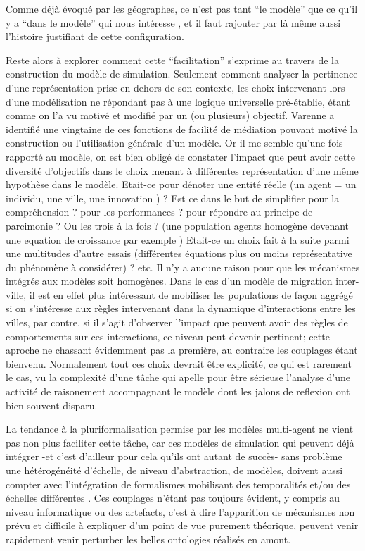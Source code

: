 Comme déjà évoqué par les géographes, ce n'est pas tant \enquote{le modèle} que ce qu'il y a \enquote{dans le modèle} qui nous intéresse \autocites{Sanders2000, Besse2000}, et il faut rajouter par là même aussi l'histoire justifiant de cette configuration. 

Reste alors à explorer comment cette \enquote{facilitation} s'exprime au travers de la construction du modèle de simulation. Seulement comment analyser la pertinence d'une représentation prise en dehors de son contexte, les choix intervenant lors d'une modélisation ne répondant pas à une logique universelle pré-établie, étant comme on l'a vu motivé et modifié par un (ou plusieurs) objectif. Varenne a identifié une vingtaine de ces fonctions de facilité de médiation pouvant motivé la construction ou l'utilisation générale d'un modèle. Or il me semble qu'une fois rapporté au modèle, on est bien obligé de constater l'impact que peut avoir cette diversité d'objectifs dans le choix menant à différentes représentation d'une même hypothèse dans le modèle. Etait-ce pour dénoter une entité réelle (un agent = un individu, une ville, une innovation ) ? Est ce dans le but de simplifier pour la compréhension ? pour les performances ? pour répondre au principe de parcimonie ? Ou les trois à la fois ? (une population agents homogène devenant une equation de croissance par exemple ) Etait-ce un choix fait à la suite parmi une multitudes d'autre essais (différentes équations plus ou moins représentative du phénomène à considérer) ? etc. Il n'y a aucune raison pour que les mécanismes intégrés aux modèles soit homogènes. Dans le cas d'un modèle de migration inter-ville, il est en effet plus intéressant de mobiliser les populations de façon aggrégé si on s'intéresse aux règles intervenant dans la dynamique d'interactions entre les villes, par contre, si il s'agit d'observer l'impact que peuvent avoir des règles de comportements sur ces interactions, ce niveau peut devenir pertinent; cette aproche ne chassant évidemment pas la première, au contraire les couplages étant bienvenu. Normalement tout ces choix devrait être explicité, ce qui est rarement le cas, vu la complexité d'une tâche qui apelle pour être sérieuse l'analyse d'une activité de raisonement accompagnant le modèle dont les jalons de reflexion ont bien souvent disparu. \autocite{Varenne2013b}

La tendance à la pluriformalisation  permise par les modèles multi-agent ne vient pas non plus faciliter cette tâche, car ces modèles de simulation qui peuvent déjà intégrer -et c'est d'ailleur pour cela qu'ils ont autant de succès- sans problème une hétérogénéité d'échelle, de niveau d'abstraction, de modèles, doivent aussi compter avec l'intégration de formalismes mobilisant des temporalités et/ou des échelles différentes \autocites{Varenne2008,Varenne2012a}. Ces couplages n'étant pas toujours évident, y compris au niveau informatique ou des artefacts, c'est à dire l'apparition de mécanismes non prévu et difficile à expliquer d'un point de vue purement théorique, peuvent venir rapidement venir perturber les belles ontologies réalisés en amont. 

